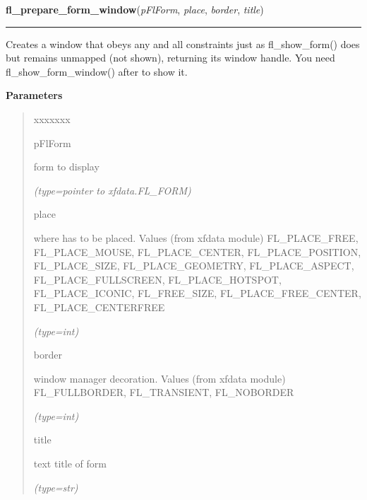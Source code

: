     \vspace{0.5ex}

\hspace{.8\funcindent}\begin{boxedminipage}{\funcwidth}

    \raggedright \textbf{fl\_prepare\_form\_window}(\textit{pFlForm}, \textit{place}, \textit{border}, \textit{title})

    \vspace{-1.5ex}

    \rule{\textwidth}{0.5\fboxrule}
\setlength{\parskip}{2ex}
    Creates a window that obeys any and all constraints just as 
    fl\_show\_form() does but remains unmapped (not shown), returning its 
    window handle. You need fl\_show\_form\_window() after to show it.

\setlength{\parskip}{1ex}
      \textbf{Parameters}
      \vspace{-1ex}

      \begin{quote}
        \begin{Ventry}{xxxxxxx}

          \item[pFlForm]

          form to display

            {\it (type=pointer to xfdata.FL\_FORM)}

          \item[place]

          where has to be placed. Values (from xfdata module) 
          FL\_PLACE\_FREE, FL\_PLACE\_MOUSE, FL\_PLACE\_CENTER, 
          FL\_PLACE\_POSITION, FL\_PLACE\_SIZE, FL\_PLACE\_GEOMETRY, 
          FL\_PLACE\_ASPECT, FL\_PLACE\_FULLSCREEN, FL\_PLACE\_HOTSPOT, 
          FL\_PLACE\_ICONIC, FL\_FREE\_SIZE, FL\_PLACE\_FREE\_CENTER, 
          FL\_PLACE\_CENTERFREE

            {\it (type=int)}

          \item[border]

          window manager decoration. Values (from xfdata module) 
          FL\_FULLBORDER, FL\_TRANSIENT, FL\_NOBORDER

            {\it (type=int)}

          \item[title]

          text title of form

            {\it (type=str)}


\end{Ventry}
\end{quote}
\end{boxedminipage}
